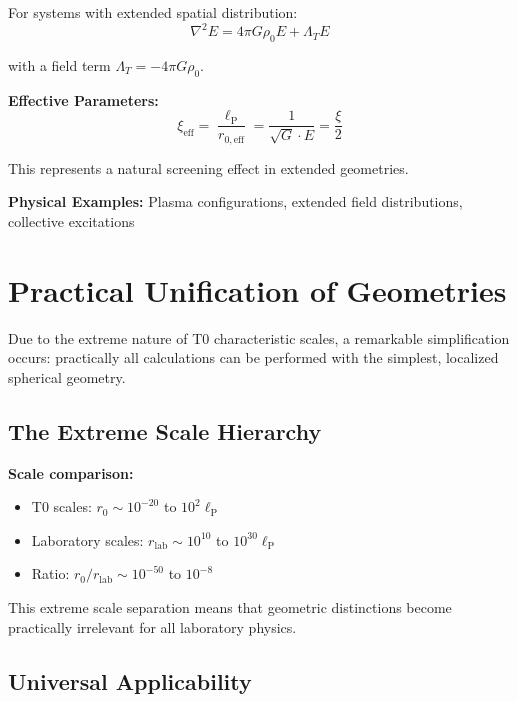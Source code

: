 \documentclass[12pt,a4paper]{report}
\newcommand{\lP}{\ell_{\text{P}}}         %
\newcommand{\Lambdat}{\Lambda_T}          %
\newcommand{\rzero}{r_0}                  %
\begin{document}
	For systems with extended spatial distribution:
	\begin{equation}
		\nabla^2 E = 4\pi G \rho_0 E + \Lambdat E
	\end{equation}
	
	with a field term $\Lambdat = -4\pi G \rho_0$.
	
	\textbf{Effective Parameters:}
	\begin{equation}
		\xi_{\text{eff}} = \frac{\lP}{r_{0,\text{eff}}} = \frac{1}{\sqrt{G} \cdot E} = \frac{\xi}{2}
	\end{equation}
	
	This represents a natural screening effect in extended geometries.
	
	\textbf{Physical Examples:} Plasma configurations, extended field distributions, collective excitations
	
	\section{Practical Unification of Geometries}
	\label{sec:practical_unification}
	
	Due to the extreme nature of T0 characteristic scales, a remarkable simplification occurs: practically all calculations can be performed with the simplest, localized spherical geometry.
	
	\subsection{The Extreme Scale Hierarchy}
	\label{subsec:extreme_scale_hierarchy}
	
	\textbf{Scale comparison:}
	\begin{itemize}
		\item T0 scales: $\rzero \sim 10^{-20}$ to $10^{2} \lP$
		\item Laboratory scales: $r_{\text{lab}} \sim 10^{10}$ to $10^{30} \lP$
		\item Ratio: $\rzero/r_{\text{lab}} \sim 10^{-50}$ to $10^{-8}$
	\end{itemize}
	
	This extreme scale separation means that geometric distinctions become practically irrelevant for all laboratory physics.
	
	\subsection{Universal Applicability}
	\label{subsec:universal_applicability}
	
\end{document}
